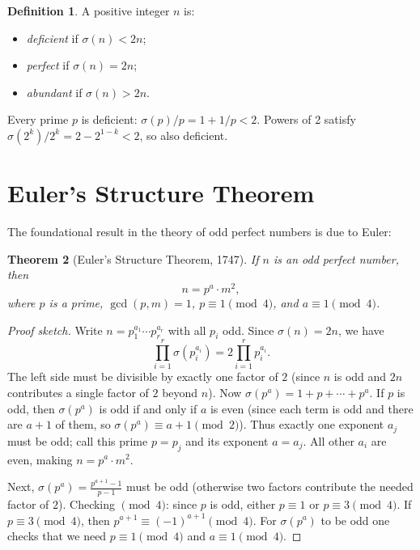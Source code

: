 \documentclass[12pt,a4paper]{amsart}
\newtheorem{theorem}{Theorem}[section]
\theoremstyle{definition}
\newtheorem{definition}[theorem]{Definition}
\theoremstyle{remark}
\begin{document}
\begin{definition}
A positive integer $n$ is:
\begin{itemize}[nosep]
  \item \emph{deficient} if $\sigma(n) < 2n$;
  \item \emph{perfect} if $\sigma(n) = 2n$;
  \item \emph{abundant} if $\sigma(n) > 2n$.
\end{itemize}
\end{definition}

Every prime $p$ is deficient: $\sigma(p)/p = 1 + 1/p < 2$.
Powers of 2 satisfy $\sigma(2^k)/2^k = 2 - 2^{1-k} < 2$, so also deficient.

\section{Euler's Structure Theorem}

The foundational result in the theory of odd perfect numbers is due to Euler:

\begin{theorem}[Euler's Structure Theorem, 1747]
\label{thm:euler}
If $n$ is an odd perfect number, then
\[
  n = p^a \cdot m^2,
\]
where $p$ is a prime, $\gcd(p, m) = 1$, $p \equiv 1 \pmod{4}$,
and $a \equiv 1 \pmod{4}$.
\end{theorem}

\begin{proof}[Proof sketch]
Write $n = p_1^{a_1} \cdots p_r^{a_r}$ with all $p_i$ odd.
Since $\sigma(n) = 2n$, we have
\[
  \prod_{i=1}^r \sigma(p_i^{a_i}) = 2 \prod_{i=1}^r p_i^{a_i}.
\]
The left side must be divisible by exactly one factor of $2$ (since $n$ is
odd and $2n$ contributes a single factor of $2$ beyond $n$).
Now $\sigma(p^a) = 1 + p + \cdots + p^a$.
If $p$ is odd, then $\sigma(p^a)$ is odd if and only if $a$ is even
(since each term is odd and there are $a+1$ of them, so $\sigma(p^a) \equiv a+1 \pmod{2}$).
Thus exactly one exponent $a_j$ must be odd; call this prime $p = p_j$ and its
exponent $a = a_j$.
All other $a_i$ are even, making $n = p^a \cdot m^2$.

Next, $\sigma(p^a) = \frac{p^{a+1}-1}{p-1}$ must be odd (otherwise two factors
contribute the needed factor of $2$).
Checking $\pmod{4}$: since $p$ is odd, either $p \equiv 1$ or $p \equiv 3 \pmod{4}$.
If $p \equiv 3 \pmod{4}$, then $p^{a+1} \equiv (-1)^{a+1} \pmod{4}$.
For $\sigma(p^a)$ to be odd one checks that we need $p \equiv 1 \pmod{4}$
and $a \equiv 1 \pmod{4}$.
\end{proof}
\end{document}
